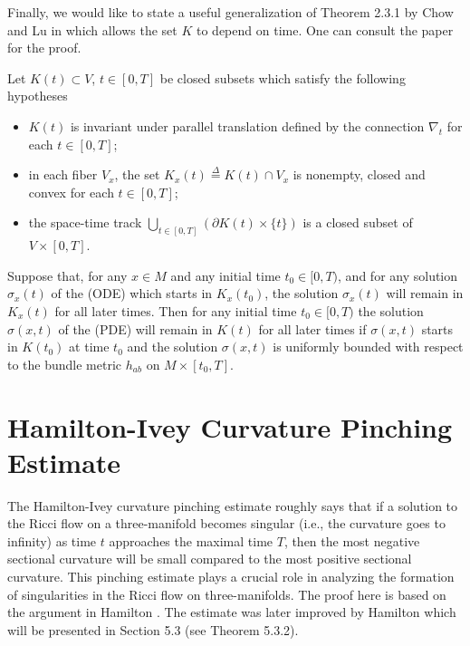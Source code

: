 Finally, we would like to state a useful generalization of Theorem
2.3.1 by Chow and Lu in \cite{Cl04} which allows the set $K$ to
depend on time. One can consult the paper \cite{Cl04} for the
proof.

\begin{theorem}
  \label{thm:cz-maximum-principle-for-closed-fiberwise-convex-sets}
Let $K(t)\subset V$, $t\in [0,T]$ be closed subsets which satisfy
the following hypotheses
\begin{itemize}
\item[(H3)] $K(t)$ is invariant under parallel translation defined
by the connection $\nabla_t$ for each $t\in [0,T]$; \item[(H4)] in
each fiber $V_x$, the set $K_x(t)\stackrel{\Delta}{=}K(t)\cap V_x$
is nonempty, closed and convex for each $t\in [0,T]$; \item[(H5)]
the space-time track $\bigcup\limits_{t\in[0,T]}(\partial
K(t)\times\{t\})$ is a closed subset of $V\times[0,T]$.
\end{itemize}
Suppose that, for any $x\in M$ and any initial time $t_0\in[0,T)$,
and for any solution $\sigma_x(t)$ of the {\rm (ODE)} which starts
in $K_x(t_0)$, the solution $\sigma_x(t)$ will remain in $K_x(t)$
for all later times. Then for any initial time $t_0\in[0,T)$ the
solution $\sigma(x,t)$ of the {\rm (PDE)} will remain in $K(t)$
for all later times if $\sigma(x,t)$ starts in $K(t_0)$ at time
$t_0$ and the solution $\sigma(x,t)$ is uniformly bounded with
respect to the bundle metric $h_{ab}$ on $M\times[t_0,T]$.
\end{theorem}


\section{Hamilton-Ivey Curvature Pinching Estimate}

The Hamilton-Ivey curvature pinching estimate \cite{Ha95F, Iv}
roughly says that if a solution to the Ricci flow on a
three-manifold becomes singular (i.e., the curvature goes to
infinity) as time $t$ approaches the maximal time $T$, then the
most negative sectional curvature will be small compared to the
most positive sectional curvature. This pinching estimate plays a
crucial role in analyzing the formation of singularities in the
Ricci flow on three-manifolds. The proof here is based on the
argument in Hamilton \cite{Ha95F}. The estimate was later improved
by Hamilton \cite{Ha99} which will be presented in Section 5.3
(see Theorem 5.3.2).

